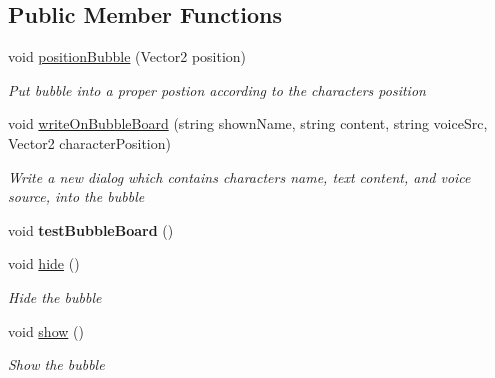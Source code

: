 \subsection*{Public Member Functions}
\begin{DoxyCompactItemize}
\item 
void \hyperlink{classdoki_unity_1_1_bubble_manager_a32d0b7cc3531c722558d0e8391bb9ed6}{position\+Bubble} (Vector2 position)
\begin{DoxyCompactList}\small\item\em Put bubble into a proper postion according to the character\textquotesingle{}s position \end{DoxyCompactList}\item 
void \hyperlink{classdoki_unity_1_1_bubble_manager_a20e2b83022b5f706b163f16eb59ccef3}{write\+On\+Bubble\+Board} (string shown\+Name, string content, string voice\+Src, Vector2 character\+Position)
\begin{DoxyCompactList}\small\item\em Write a new dialog which contains character\textquotesingle{}s name, text content, and voice source, into the bubble \end{DoxyCompactList}\item 
void {\bfseries test\+Bubble\+Board} ()\hypertarget{classdoki_unity_1_1_bubble_manager_a23701d98518b8ed68677bf1e2db5cf64}{}\label{classdoki_unity_1_1_bubble_manager_a23701d98518b8ed68677bf1e2db5cf64}

\item 
void \hyperlink{classdoki_unity_1_1_bubble_manager_abd71a1a5bac4f2950d01bfe61533cbee}{hide} ()
\begin{DoxyCompactList}\small\item\em Hide the bubble \end{DoxyCompactList}\item 
void \hyperlink{classdoki_unity_1_1_bubble_manager_a0124bfae9674f83d5163951215025ca3}{show} ()
\begin{DoxyCompactList}\small\item\em Show the bubble \end{DoxyCompactList}\end{DoxyCompactItemize}
